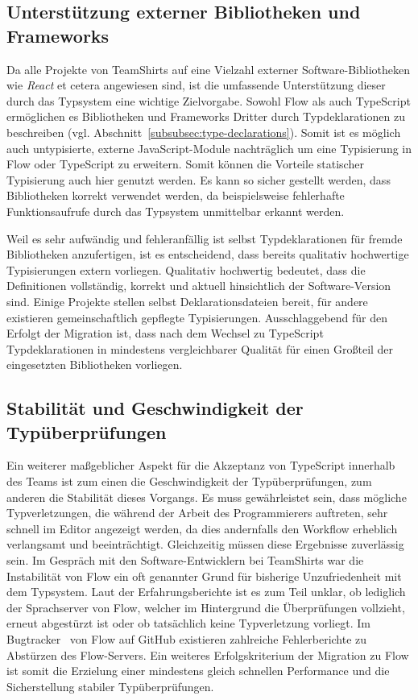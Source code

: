 \subsection{Unterstützung externer Bibliotheken und Frameworks}

Da alle Projekte von TeamShirts auf eine Vielzahl externer Software-Bibliotheken wie \textit{React} et cetera angewiesen sind, ist die umfassende Unterstützung dieser durch das Typsystem eine wichtige Zielvorgabe. Sowohl Flow als auch TypeScript ermöglichen es Bibliotheken und Frameworks Dritter durch Typdeklarationen zu beschreiben (vgl. Abschnitt~\ref{subsubsec:type-declarations}). Somit ist es möglich auch untypisierte, externe JavaScript-Module nachträglich um eine Typisierung in Flow oder TypeScript zu erweitern. Somit können die Vorteile statischer Typisierung auch hier genutzt werden. Es kann so sicher gestellt werden, dass Bibliotheken korrekt verwendet werden, da beispielsweise fehlerhafte Funktionsaufrufe durch das Typsystem unmittelbar erkannt werden.

Weil es sehr aufwändig und fehleranfällig ist selbst Typdeklarationen für fremde Bibliotheken anzufertigen, ist es entscheidend, dass bereits qualitativ hochwertige Typisierungen extern vorliegen. Qualitativ hochwertig bedeutet, dass die Definitionen vollständig, korrekt und aktuell hinsichtlich der Software-Version sind. Einige Projekte stellen selbst Deklarationsdateien bereit, für andere existieren gemeinschaftlich gepflegte Typisierungen. Ausschlaggebend für den Erfolgt der Migration ist, dass nach dem Wechsel zu TypeScript Typdeklarationen in mindestens vergleichbarer Qualität für einen Großteil der eingesetzten Bibliotheken vorliegen.

\subsection{Stabilität und Geschwindigkeit der Typüberprüfungen}

Ein weiterer maßgeblicher Aspekt für die Akzeptanz von TypeScript innerhalb des Teams ist zum einen die Geschwindigkeit der Typüberprüfungen, zum anderen die Stabilität dieses Vorgangs. Es muss gewährleistet sein, dass mögliche Typverletzungen, die während der Arbeit des Programmierers auftreten, sehr schnell im Editor angezeigt werden, da dies andernfalls den Workflow erheblich verlangsamt und beeinträchtigt. Gleichzeitig müssen diese Ergebnisse zuverlässig sein. Im Gespräch mit den Software-Entwicklern bei TeamShirts war die Instabilität von Flow ein oft genannter Grund für bisherige Unzufriedenheit mit dem Typsystem. Laut der Erfahrungsberichte ist es zum Teil unklar, ob lediglich der Sprachserver von Flow, welcher im Hintergrund die Überprüfungen vollzieht, erneut abgestürzt ist oder ob tatsächlich keine Typverletzung vorliegt. Im Bugtracker~\autocite{FLOW:BUGTRACKER} von Flow auf GitHub existieren zahlreiche Fehlerberichte zu Abstürzen des Flow-Servers. Ein weiteres Erfolgskriterium der Migration zu Flow ist somit die Erzielung einer mindestens gleich schnellen Performance und die Sicherstellung stabiler Typüberprüfungen.

